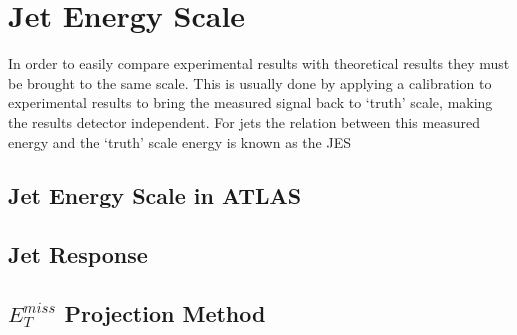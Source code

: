 \chapter{Jet Energy Scale}
\label{JES}

In order to easily compare experimental results with theoretical results they must be brought to the same scale.  
This is usually done by applying a calibration to experimental results to bring the measured signal back to `truth' scale, making the results detector independent.  
For jets the relation between this measured energy and the `truth' scale energy is known as the \gls{JES}


\section{Jet Energy Scale in ATLAS}
\label{ATLASJES}

\section{Jet Response}

\section{$E_T^{miss}$ Projection Method}
\label{METProj}









